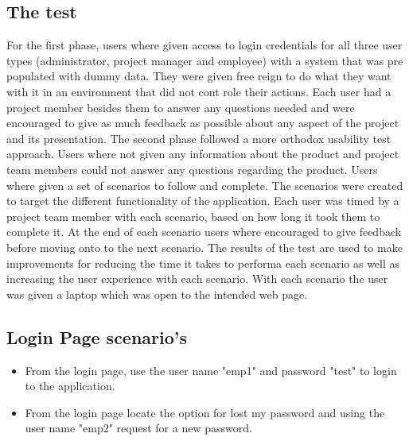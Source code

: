 \documentclass[]{article}
\begin{document}
	\subsection{The test}
	For the first phase, users where given access to login credentials for all three user types (administrator, project manager and employee) with a system that was pre populated with dummy data. They were given free reign to do what they want with it in an environment that did not cont role their actions. Each user had a project member besides them to answer any questions needed and were encouraged to give as much feedback as possible about any aspect of the project and its presentation.
	\newline
	\newline
	The second phase followed a more orthodox usability test approach. Users where not given any information about the product and project team members could not answer any questions regarding the product. Users where given a set of scenarios to follow and complete. The scenarios were created to target the different functionality of the application. Each user was timed by a project team member with each scenario, based on how long it took them to complete it. At the end of each scenario users where encouraged to give feedback before moving onto to the next scenario. The results of the test are used to make improvements for reducing the time it takes to performa each scenario as well as increasing the user experience with each scenario.
	\newline
	\newline
	With each scenario the user was given a laptop which was open to the intended web page.
	\subsection{Login Page scenario's}
	\begin{itemize}
    	    \item From the login page, use the user name "emp1" and password "test" to login to the application.
    	    
    	    \item From the login page locate the option for lost my password and using the user name "emp2" request for a new password.
    \end{itemize}
    
\end{document}
